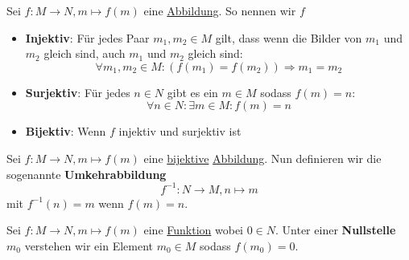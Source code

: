 \documentclass[../../main.tex]{subfiles}
\begin{document}
	\begin{definition}
		\label{def:Injektiv}
		\label{def:Surjketiv}
		\label{def:Bijektiv}
		Sei $f: M \rightarrow N, m \mapsto f(m)$ eine \hyperref[def:Abbildung]{Abbildung}. So nennen wir $f$
		\begin{itemize}
			\item \textbf{Injektiv}: Für jedes Paar $m_1,m_2 \in M$ gilt, dass wenn die Bilder von $m_1$ und $m_2$ gleich sind, auch $m_1$ und $m_2$ gleich sind: $$\forall m_1,m_2 \in M: (f(m_1)=f(m_2)) \Rightarrow m_1 = m_2$$
			\item \textbf{Surjektiv}: Für jedes $n \in N$ gibt es ein $m \in M$ sodass $f(m)=n$: $$\forall n \in N: \exists m \in M: f(m)=n$$
			\item \textbf{Bijektiv}: Wenn $f$ injektiv und surjektiv ist
		\end{itemize}
	\end{definition}

	\begin{definition}[Umkehrabbildung]
		\label{def:Umkehrabbildung}
		Sei $f: M \rightarrow N, m \mapsto f(m)$ eine \hyperref[def:Bijektiv]{bijektive} \hyperref[def:Abbildung]{Abbildung}. Nun definieren wir die sogenannte \textbf{Umkehrabbildung} $$f^{-1}: N \rightarrow M, n \mapsto m$$ mit $f^{-1}(n)=m$ wenn $f(m)=n$.
	\end{definition}

	\begin{definition}[Nullstelle]
		\label{def:Nullstelle}
		Sei $f: M \rightarrow N, m \mapsto f(m)$ eine \hyperref[def:Funktion]{Funktion} wobei $0 \in N$. Unter einer \textbf{Nullstelle} $m_0$ verstehen wir ein Element $m_0 \in M$ sodass $f(m_0)=0$. 
	\end{definition}
\end{document}
